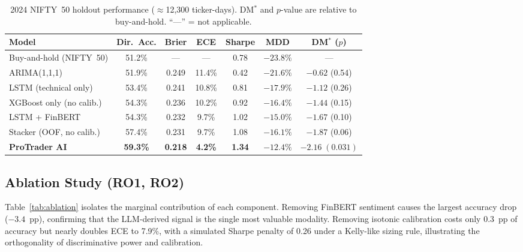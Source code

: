 \documentclass[12pt,a4paper]{article}
\begin{document}
\begin{table}[h]
\centering
\caption{2024 NIFTY~50 holdout performance ($\approx$12{,}300 ticker-days).
DM$^*$ and $p$-value are relative to buy-and-hold. ``---'' = not applicable.}
\label{tab:main}
\footnotesize\setlength{\tabcolsep}{3pt}
\begin{tabular}{lcccccc}
\toprule
\textbf{Model} & \textbf{Dir.\ Acc.} & \textbf{Brier} & \textbf{ECE}
  & \textbf{Sharpe} & \textbf{MDD} & \textbf{DM$^*$ ($p$)} \\
\midrule
Buy-and-hold (NIFTY~50)   & 51.2\% & ---   & ---    & 0.78 & $-23.8\%$ & --- \\
ARIMA(1,1,1)               & 51.9\% & 0.249 & 11.4\% & 0.42 & $-21.6\%$ & $-0.62$ (0.54) \\
LSTM (technical only)      & 53.4\% & 0.241 & 10.8\% & 0.81 & $-17.9\%$ & $-1.12$ (0.26) \\
XGBoost only (no calib.)   & 54.3\% & 0.236 & 10.2\% & 0.92 & $-16.4\%$ & $-1.44$ (0.15) \\
LSTM + FinBERT \cite{r5}   & 54.3\% & 0.232 & 9.7\%  & 1.02 & $-15.0\%$ & $-1.67$ (0.10) \\
Stacker (OOF, no calib.)   & 57.4\% & 0.231 & 9.7\%  & 1.08 & $-16.1\%$ & $-1.87$ (0.06) \\
\textbf{ProTrader AI}      & \textbf{59.3\%} & \textbf{0.218} & \textbf{4.2\%}
  & \textbf{1.34} & $\mathbf{-12.4\%}$ & $\mathbf{-2.16\;(0.031)}$ \\
\bottomrule
\end{tabular}
\end{table}

\subsection{Ablation Study (RO1, RO2)}

Table~\ref{tab:ablation} isolates the marginal contribution of each component.
Removing FinBERT sentiment causes the largest accuracy drop ($-3.4$~pp), confirming
that the LLM-derived signal is the single most valuable modality. Removing
isotonic calibration costs only 0.3~pp of accuracy but nearly doubles ECE to 7.9\%,
with a simulated Sharpe penalty of 0.26 under a Kelly-like sizing rule,
illustrating the orthogonality of discriminative power and calibration.
\end{document}
